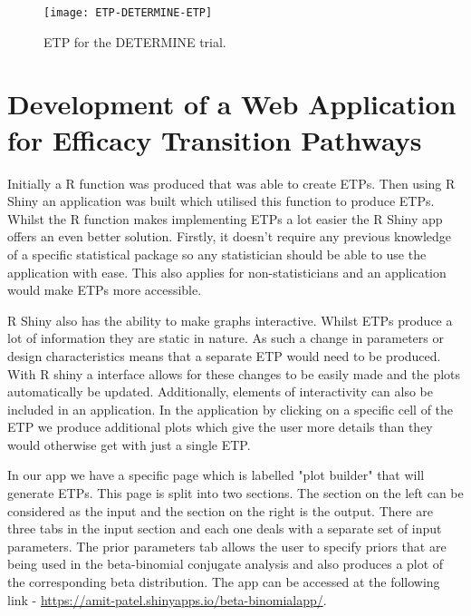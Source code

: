 \begin{sidewaysfigure}[h!]
	\centering
	\caption{ETP for the DETERMINE trial.}
	\label{fig_etp:DETERMINE-ETP}
	\texttt{[image: ETP-DETERMINE-ETP]}
\end{sidewaysfigure} 

\clearpage

\section{Development of a Web Application for Efficacy Transition Pathways}

Initially a R function was produced that was able to create ETPs. Then using R Shiny an application was built which utilised this function to produce ETPs. Whilst the R function makes implementing ETPs a lot easier the R Shiny app offers an even better solution. Firstly, it doesn't require any previous knowledge of a specific statistical package so any statistician should be able to use the application with ease. This also applies for non-statisticians and an application would make ETPs more accessible. 

R Shiny also has the ability to make graphs interactive. Whilst ETPs produce a lot of information they are static in nature. As such a change in parameters or design characteristics means that a separate ETP would need to be produced. With R shiny a interface allows for these changes to be easily made and the plots automatically be updated. Additionally, elements of interactivity can also be included in an application. In the application by clicking on a specific cell of the ETP we produce additional plots which give the user more details than they would otherwise get with just a single ETP. 

In our app we have a specific page which is labelled "plot builder" that will generate ETPs. This page is split into two sections. The section on the left can be considered as the input and the section on the right is the output. There are three tabs in the input section and each one deals with a separate set of input parameters. The prior parameters tab allows the user to specify priors that are being used in the beta-binomial conjugate analysis and also produces a plot of the corresponding beta distribution. The app can be accessed at the following link - \href{ https://amit-patel.shinyapps.io/beta-binomialapp/}{https://amit-patel.shinyapps.io/beta-binomialapp/}. 


